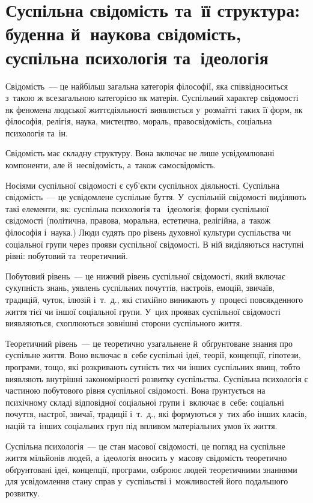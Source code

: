 \documentclass[a5paper,oneside,DIV=12,12pt,headings=small]{scrartcl}
\begin{document}
	\section{Суспільна свідомість та~її структура: буденна й~наукова свідомість, суспільна психологія та~ідеологія}

		Свідомість~— це найбільш загальна категорія філософії, яка співвідноситься з~такою ж всезагальною категорією як матерія.  Суспільний характер свідомості як феномена людської життєдіяльності виявляється у~розмаїтті таких її форм, як філософія, релігія, наука, мистецтво, мораль, правосвідомість, соціальна психологія та~ін.
		
		Свідомість має складну структуру. Вона включає не лише усвідомлювані компоненти, але й~несвідомість, а~також самосвідомість.
		
		Носіями суспільної свідомості є суб'\-єкти суспільнох діяльності. Суспільна свідомість~— це усвідомлене суспільне буття. У~суспільній свідомості виділяють такі елементи, як: суспільна психологія та~ ідеологія; форми суспільної свідомості (політична, правова, моральна, естетична, релігійна, а~також філософія і~наука.) Люди судять про рівень духовної культури суспільства чи соціальної групи  через прояви суспільної свідомості. В ній виділяються наступні рівні: побутовий та~теоретичний.
		
		Побутовий рівень~— це нижчий рівень суспільної свідомості, який включає сукупність знань, уявлень суспільних почуттів, настроїв, емоцій, звичаїв, традицій, чуток, ілюзій і~т.~д., які стихійно виникають у~процесі повсякденного життя тієї  чи іншої соціальної групи. У~цих проявах суспільної свідомості виявляються, схоплюються зовнішні сторони суспільного життя.
		
		Теоретичний рівень~— це теоретично узагальнене й~обґрунтоване знання про суспільне життя. Воно включає в~себе суспільні ідеї, теорії, концепції, гіпотези, програми, тощо, які розкривають сутність тих чи інших суспільних явищ, тобто виявляють внутрішні закономірності розвитку суспільства.
		Суспільна психологія є частиною побутового рівня суспільної свідомості. Вона ґрунтується на психічному складі відповідної соціальної групи і~включає в~себе: соціальні почуття, настрої, звичаї, традиції і~т.~д., які формуються у~тих або інших класів, націй та~інших соціальних груп під впливом  матеріальних умов їх життя. 
		
		Суспільна психологія~— це стан масової свідомості, це погляд на суспільне життя мільйонів людей, а~ідеологія вносить у~масову свідомість теоретично обґрунтовані ідеї, концепції, програми, озброює людей теоретичними знаннями для усвідомлення стану справ у~суспільстві і~можливостей його подальшого розвитку.
		
\end{document}
